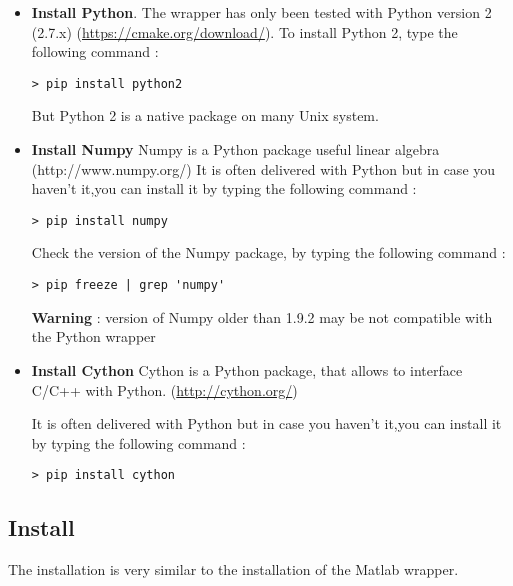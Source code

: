 \begin{itemize}
\item \textbf{Install Python}. The wrapper has only been tested with Python version 2 (2.7.x) (\url{https://cmake.org/download/}).
To install Python 2, type the following command :
\lstset{style=customBash}
\begin{lstlisting}
> pip install python2
\end{lstlisting}
But Python 2 is a native package on many Unix system.
 
\item \textbf{Install Numpy}
Numpy is a Python package useful linear algebra (http://www.numpy.org/)
It is often delivered with Python but in case you haven't it,you can install it by typing the following command :
\lstset{style=customBash}
\begin{lstlisting}
> pip install numpy
\end{lstlisting}

Check the version of the Numpy package,
by typing the following command :
\lstset{style=customBash}
\begin{lstlisting}
> pip freeze | grep 'numpy'
\end{lstlisting}

\textbf{Warning} : version of Numpy older than 1.9.2 may be not compatible with the Python wrapper
 
\item \textbf{Install Cython}
Cython is a Python package, that allows to interface C/C++ with Python. (\url{http://cython.org/})

It is often delivered with Python but in case you haven't it,you can install it by typing the following command :
\lstset{style=customBash}
\begin{lstlisting}
> pip install cython
\end{lstlisting}

\end{itemize}



\subsection{Install}
The installation is very similar to the installation of the Matlab wrapper. 


